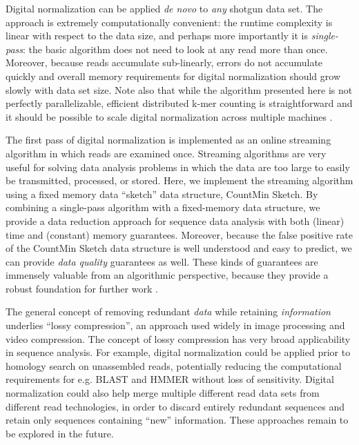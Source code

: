 \documentclass{pnastwo}
\begin{document}
\begin{article}
Digital normalization can be applied {\em de novo} to {\em any}
shotgun data set.  The approach is extremely computationally
convenient: the runtime complexity is linear with respect to the data
size, and perhaps more importantly it is {\em single-pass}: the basic
algorithm does not need to look at any read more than once.  Moreover,
because reads accumulate sub-linearly, errors do not accumulate
quickly and overall memory requirements for digital normalization
should grow slowly with data set size.  Note also that while the
algorithm presented here is not perfectly parallelizable, efficient
distributed k-mer counting is straightforward and it should be
possible to scale digital normalization across multiple machines
\cite{pubmed19357099}.

The first pass of digital normalization is implemented as an online
streaming algorithm in which reads are examined once.  Streaming
algorithms are very useful for solving data analysis problems in which
the data are too large to easily be transmitted, processed, or
stored.  Here, we implement the streaming algorithm using a fixed
memory data ``sketch'' data structure, CountMin Sketch.  By combining
a single-pass algorithm with a fixed-memory data structure, we provide
a data reduction approach for sequence data analysis with both
(linear) time and (constant) memory guarantees. Moreover, because the
false positive rate of the CountMin Sketch data structure is well
understood and easy to predict, we can provide {\em data quality}
guarantees as well.  These kinds of guarantees are immensely
valuable from an algorithmic perspective, because they provide a
robust foundation for further work \cite{muthukrishnan2005data}.

The general concept of removing redundant {\em data} while retaining
{\em information} underlies ``lossy compression'', an approach used
widely in image processing and video compression.  The concept of
lossy compression has very broad applicability in sequence analysis.
For example, digital normalization could be applied prior to homology
search on unassembled reads, potentially reducing the computational
requirements for e.g. BLAST and HMMER without loss of sensitivity.
Digital normalization could also help merge multiple different read
data sets from different read technologies, in order to discard
entirely redundant sequences and retain only sequences containing
``new'' information.  These approaches remain to be explored in the future.


\end{article}
\end{document}
